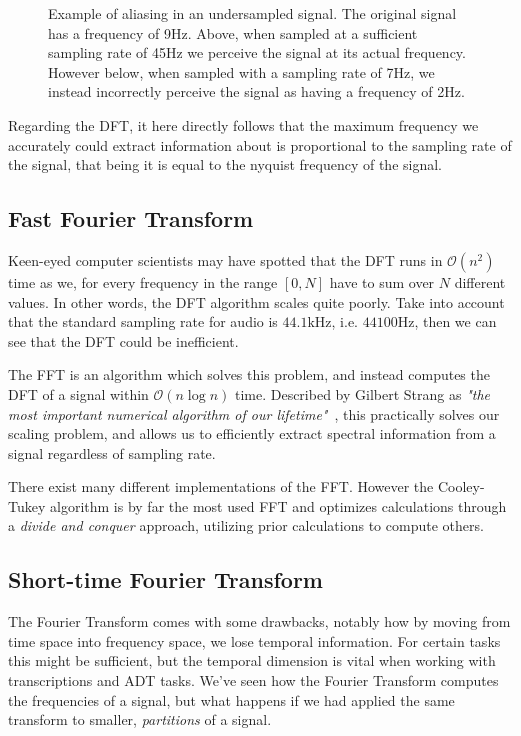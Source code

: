 \begin{figure}[H]
    \centering
    
    \caption{Example of aliasing in an undersampled signal. The original signal has a frequency of 9Hz. Above, when sampled at a sufficient sampling rate of 45Hz we perceive the signal at its actual frequency. However below, when sampled with a sampling rate of 7Hz, we instead incorrectly perceive the signal as having a frequency of 2Hz.}
    \label{AliasingFigure}
\end{figure}

Regarding the \gls{DFT}, it here directly follows that the maximum frequency we accurately could extract information about is proportional to the sampling rate of the signal, that being it is equal to the nyquist frequency of the signal.

\subsection{Fast Fourier Transform}

Keen-eyed computer scientists may have spotted that the \gls{DFT} runs in $\mathcal{O}(n^2)$ time as we, for every frequency in the range $[0, N]$ have to sum over $N$ different values. In other words, the \gls{DFT} algorithm scales quite poorly. Take into account that the standard sampling rate for audio is $44.1 \text{kHz}$, i.e. $44100 \text{Hz}$, then we can see that the \gls{DFT} could be inefficient.~\cite{pras2010sampling}

The \gls{FFT} is an algorithm which solves this problem, and instead computes the \gls{DFT} of a signal within $\mathcal{O}(n\log{n})$ time. Described by Gilbert Strang as \textit{"the most important numerical algorithm of our lifetime"}~\cite{strang1993wavelet}, this practically solves our scaling problem, and allows us to efficiently extract spectral information from a signal regardless of sampling rate.

There exist many different implementations of the \gls{FFT}. However the Cooley-Tukey algorithm is by far the most used \gls{FFT} and optimizes calculations through a \textit{divide and conquer} approach, utilizing prior calculations to compute others.~\cite{d3ea2d52-5ab2-3128-8b80-efb85267295d}

\subsection{Short-time Fourier Transform}

The Fourier Transform comes with some drawbacks, notably how by moving from time space into frequency space, we lose temporal information. For certain tasks this might be sufficient, but the temporal dimension is vital when working with transcriptions and \gls{ADT} tasks. We've seen how the Fourier Transform computes the frequencies of a signal, but what happens if we had applied the same transform to smaller, \textit{partitions} of a signal.

